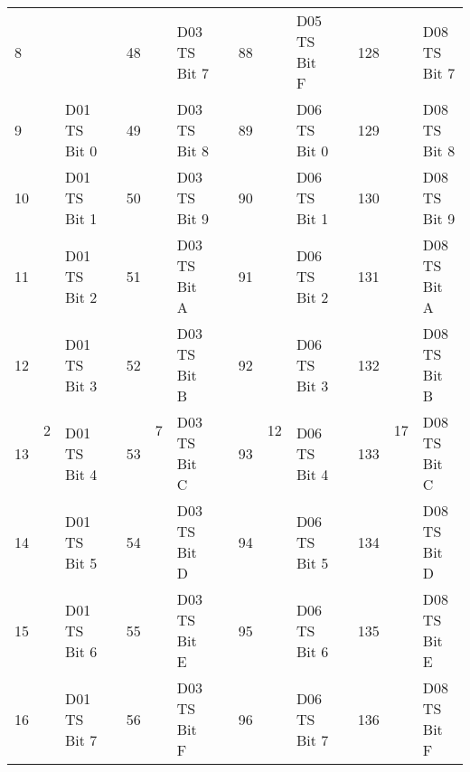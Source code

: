 \documentclass[]{article}
\begin{document}
\begin{landscape}
\begin{table}[]
\begin{tabular}{lllllllllllllll}
			8            &                    &                               &                   & 48           &                     & D03 TS Bit 7      &  & 88           &                     & D05 TS Bit F      &  & 128          &                     & D08 TS Bit 7      \\ \cline{1-3} \cline{5-7} \cline{9-11} \cline{13-15} 
			9            & \multirow{8}{*}{2} & D01 TS Bit 0                  &                   & 49           & \multirow{8}{*}{7}  & D03 TS Bit 8      &  & 89           & \multirow{8}{*}{12} & D06 TS Bit 0      &  & 129          & \multirow{8}{*}{17} & D08 TS Bit 8      \\
			10           &                    & D01 TS Bit 1                  &                   & 50           &                     & D03 TS Bit 9      &  & 90           &                     & D06 TS Bit 1      &  & 130          &                     & D08 TS Bit 9      \\
			11           &                    & D01 TS Bit 2                  &                   & 51           &                     & D03 TS Bit A      &  & 91           &                     & D06 TS Bit 2      &  & 131          &                     & D08 TS Bit A      \\
			12           &                    & D01 TS Bit 3                  &                   & 52           &                     & D03 TS Bit B      &  & 92           &                     & D06 TS Bit 3      &  & 132          &                     & D08 TS Bit B      \\
			13           &                    & D01 TS Bit 4                  &                   & 53           &                     & D03 TS Bit C      &  & 93           &                     & D06 TS Bit 4      &  & 133          &                     & D08 TS Bit C      \\
			14           &                    & D01 TS Bit 5                  &                   & 54           &                     & D03 TS Bit D      &  & 94           &                     & D06 TS Bit 5      &  & 134          &                     & D08 TS Bit D      \\
			15           &                    & D01 TS Bit 6                  &                   & 55           &                     & D03 TS Bit E      &  & 95           &                     & D06 TS Bit 6      &  & 135          &                     & D08 TS Bit E      \\
			16           &                    & D01 TS Bit 7                  &                   & 56           &                     & D03 TS Bit F      &  & 96           &                     & D06 TS Bit 7      &  & 136          &                     & D08 TS Bit F      \\ \cline{1-3} \cline{5-7} \cline{9-11} \cline{13-15} 

\end{tabular}
\end{table}
\end{landscape}
\end{document}
